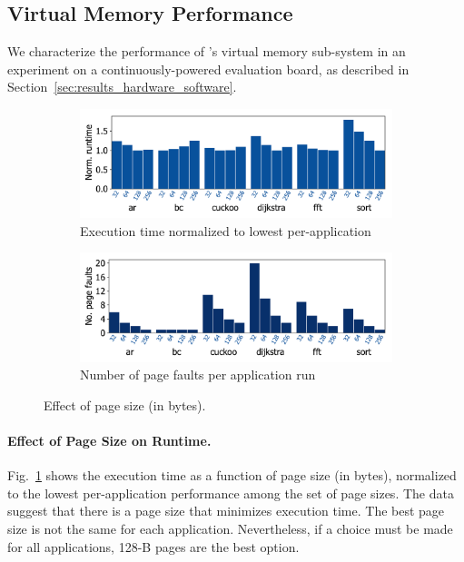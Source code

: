 \subsection{Virtual Memory Performance}
\label{sec:results_memory_management}

We characterize the performance of \sys's virtual memory sub-system in an
experiment on a continuously-powered evaluation board, as described in
Section~\ref{sec:results_hardware_software}.

\begin{figure}
	\centering
    \begin{subfigure}{\columnwidth}
			\centering
        \includegraphics[width=.8\columnwidth]{figures/page_exec-time.pdf}
        \caption{Execution time normalized to lowest per-application}
        \label{fig:page-exec-time}
    \end{subfigure}
    \begin{subfigure}{\columnwidth}
			\centering
        \includegraphics[width=.8\columnwidth]{figures/pagePulls.pdf}
        \caption{Number of page faults per application run}
        \label{fig:page-pulls}
    \end{subfigure}
    \caption{Effect of page size (in bytes).}
    \label{fig:war}
\end{figure}

\paragraph{Effect of Page Size on Runtime.}

Fig.~\ref{fig:page-exec-time} shows the execution time as a function
of page size (in bytes), normalized to the lowest per-application performance among the
set of page sizes.
The data suggest that there is a page size that minimizes execution time.
The best page size is not the same for
each application. Nevertheless, if a choice must be made for all applications,
128-B pages are the best option.

